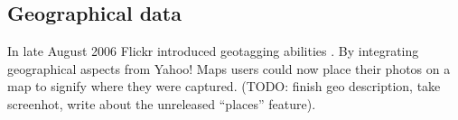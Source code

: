 
\subsection{Geographical data}
In late August 2006 Flickr introduced geotagging abilities%
.
By integrating
geographical aspects from Yahoo! Maps%
users could now place their photos on a
map to signify where they were captured. (TODO: finish geo description, take
screenhot, write about the unreleased ``places'' feature).


